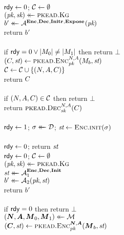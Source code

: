 \begin{figure}[t]
  \newcommand{\rdy}{\flagfont{rdy}}
  {
    \\[2pt]
      $\rdy \gets \false$; $\mathcal{C} \gets \emptyset$\\
      $(\textit{pk}, \textit{sk}) \mathrel{\leftarrow\mkern-14mu\leftarrow} \textsc{pkead}.\textsc{Kg}$\\
      $b' \mathrel{\leftarrow\mkern-14mu\leftarrow} \mathcal{A}^{\mathbf{Enc}\hspace{0.5pt},\mathbf{Dec}\hspace{0.5pt},\mathbf{Initr}\hspace{0.5pt},\mathbf{Expose}\hspace{0.5pt}}(\textit{pk})$\\
      return $b'$
    \\[9pt]
    \\[2pt]
      if $\rdy=\false \OR |\msg_0|\ne|\msg_1|$ then return $\bot$\\
      $(C, \textit{st}) \gets \textsc{pkead}.\textsc{Enc}_{\textit{pk}}^{N,A}(M_b, \textit{st})$\\
      $\mathcal{C} \gets \mathcal{C} \cup \{(N, A, C)\}$\\
      return $C$
    \\[6pt]
    \oraclev{$\DECO(\nonce, \ad, \cipher)$}\\[2pt]
      if $(N, A, C) \in \mathcal{C}$ then return $\bot$\\
      return $\textsc{pkead}.\textsc{Dec}_{\textit{sk}}^{N,A}(C)$
    \\[6pt]
    \oraclev{$\INITRO(\dist)$}\\[2pt]
      $\rdy \gets \true$;
      $\sigma \mathrel{\leftarrow\mkern-14mu\leftarrow} \mathcal{D}$;
      $\textit{st} \gets \textsc{Enc}.\textsc{init}(\sigma)$
    \\[6pt]
    \oraclev{$\EXPO(\,)$}\\[2pt]
      $\rdy \gets \false$; return $\textit{st}$
  }
  {
    \\[2pt]
      $\rdy \gets \false$;
      $\mathcal{C} \gets \emptyset$\\
      $(\textit{pk}, \textit{sk}) \mathrel{\leftarrow\mkern-14mu\leftarrow} \textsc{pkead}.\textsc{Kg}$\\
      $\textit{st} \mathrel{\leftarrow\mkern-14mu\leftarrow} \mathcal{A}_1^{\mathbf{Enc}\hspace{0.5pt},\mathbf{Dec}\hspace{0.5pt},\mathbf{Init}\hspace{0.5pt}}$\\
      $b' \mathrel{\leftarrow\mkern-14mu\leftarrow} \mathcal{A}_2(\textit{pk},\textit{st})$\\
      return $b'$
    \\[6pt]
    \oraclev{$\ENCO(\srcM)$}\\[2pt]
      if $\rdy = \false$ then return $\bot$\\
      $(\vnonce, \vad, \vmsg_0, \vmsg_1) \getsr \srcM$\\
      $(\vcipher, \st) \gets \pkead.\Enc_\pk^{\vnonce,\vad}(\vmsg_b, \st)$\\
}
\end{figure}
